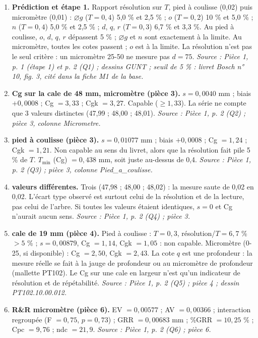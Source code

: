\documentclass[10pt,a4paper]{article}
\newcommand{\src}[1]{{\footnotesize\color{uimm}\textit{Source : #1}}}
\begin{document}
\begin{enumerate}[label=\textcolor{cyan}{\textbf{Q\arabic*.}},leftmargin=22pt,itemsep=5pt]
\item \textbf{Prédiction et étape 1.} Rapport résolution sur $T$, pied à coulisse (0,02) puis micromètre (0,01) : $\varnothing g$ ($T = 0{,}4$) 5,0 \% et 2,5 \% ; $o$ ($T = 0{,}2$) 10 \% et 5,0 \% ; $n$ ($T = 0{,}4$) 5,0 \% et 2,5 \% ; $d$, $q$, $r$ ($T = 0{,}3$) 6,7 \% et 3,3 \%. Au pied à coulisse, $o$, $d$, $q$, $r$ dépassent 5 \% ; $\varnothing g$ et $n$ sont exactement à la limite. Au micromètre, toutes les cotes passent ; $o$ est à la limite. La résolution n'est pas le seul critère : un micromètre 25-50 ne mesure pas $d = 75$. \src{Pièce 1, p. 1 (étape 1) et p. 2 (Q1) ; dessins GUNT ; seuil de 5 \% : livret Bosch n° 10, fig. 3, cité dans la fiche M1 de la base.}
\item \textbf{Cg sur la cale de 48 mm, micromètre (pièce 3).} $s = 0{,}0040$ mm ; biais $+0{,}0008$ ; Cg $= 3{,}33$ ; Cgk $= 3{,}27$. Capable ($\ge 1{,}33$). La série ne compte que 3 valeurs distinctes (47,99 ; 48,00 ; 48,01). \src{Pièce 1, p. 2 (Q2) ; pièce 3, colonne Micrometre.}
\item \textbf{pied à coulisse (pièce 3).} $s = 0{,}01077$ mm ; biais $+0{,}0008$ ; Cg $= 1{,}24$ ; Cgk $= 1{,}21$. Non capable au sens du livret, alors que la résolution fait pile 5 \% de $T$. $T_{\min}$ (Cg) $= 0{,}438$ mm, soit juste au-dessus de 0,4. \src{Pièce 1, p. 2 (Q3) ; pièce 3, colonne Pied\_a\_coulisse.}
\item \textbf{valeurs différentes.} Trois (47,98 ; 48,00 ; 48,02) : la mesure saute de 0,02 en 0,02. L'écart type observé est surtout celui de la résolution et de la lecture, pas celui de l'arbre. Si toutes les valeurs étaient identiques, $s = 0$ et Cg n'aurait aucun sens. \src{Pièce 1, p. 2 (Q4) ; pièce 3.}
\item \textbf{cale de 19 mm (pièce 4).} Pied à coulisse : $T = 0{,}3$, résolution/$T = 6{,}7$ \% $> 5$ \% ; $s = 0{,}00879$, Cg $= 1{,}14$, Cgk $= 1{,}05$ : non capable. Micromètre (0-25, si disponible) : Cg $= 2{,}50$, Cgk $= 2{,}43$. La cote $q$ est une profondeur : la mesure réelle se fait à la jauge de profondeur ou au micromètre de profondeur (mallette PT102). Le Cg sur une cale en largeur n'est qu'un indicateur de résolution et de répétabilité. \src{Pièce 1, p. 2 (Q5) ; pièce 4 ; dessin PT102.10.00.012.}
\item \textbf{R\&R micromètre (pièce 6).} EV $= 0{,}00577$ ; AV $= 0{,}00366$ ; interaction regroupée (F $= 0{,}75$, $p = 0{,}73$) ; GRR $= 0{,}00683$ mm ; \%GRR $= 10{,}25$ \% ; Cpc $= 9{,}76$ ; ndc $= 21{,}9$. \src{Pièce 1, p. 2 (Q6) ; pièce 6.}

\end{enumerate}
\end{document}
